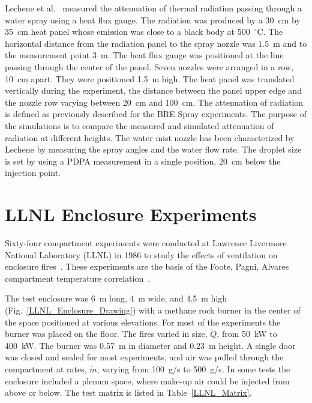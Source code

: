 Lechene et al.~\cite{Lechene} measured the attenuation of thermal radiation passing through a water spray using a heat flux gauge. The radiation was produced by a 30~cm by 35~cm heat panel whose emission was close to a black body at 500~$^\circ$C. The horizontal distance from the radiation panel to the spray nozzle was 1.5~m and to the measurement point 3~m. The heat flux gauge was positioned at the line passing through the center of the panel. Seven nozzles were arranged in a row, 10~cm apart. They were positioned 1.5~m high. The heat panel was translated vertically during the experiment, the distance between the panel upper edge and the nozzle row varying between 20~cm and 100~cm. The attenuation of radiation is defined as previously described for the BRE Spray experiments. The purpose of the simulations is to compare the measured and simulated attenuation of radiation at different heights. The water mist nozzle has been characterized by Lechene by measuring the spray angles and the water flow rate. The droplet size is set by using a PDPA measurement in a single position, 20~cm below the injection point.


\section{LLNL Enclosure Experiments}
\label{LLNL_Enclosure_Description}

Sixty-four compartment experiments were conducted at Lawrence Livermore National Laboratory (LLNL) in 1986 to study the effects of ventilation on enclosure fires~\cite{Foote:LLNL1986}. These experiments are the basis of the Foote, Pagni, Alvares compartment temperature correlation~\cite{Foote:IAFSS1}.

The test enclosure was 6~m long, 4~m wide, and 4.5~m high (Fig.~\ref{LLNL_Enclosure_Drawing}) with a methane rock burner in the center of the space positioned at various elevations. For most of the experiments the burner was placed on the floor. The fires varied in size, $\dot{Q}$, from 50~kW to 400~kW. The burner was 0.57~m in diameter and 0.23~m height. A single door was closed and sealed for most experiments, and air was pulled through the compartment at rates, $\dot{m}$, varying from 100~g/s to 500~g/s. In some tests the enclosure included a plenum space, where make-up air could be injected from above or below. The test matrix is listed in Table~\ref{LLNL_Matrix}.

